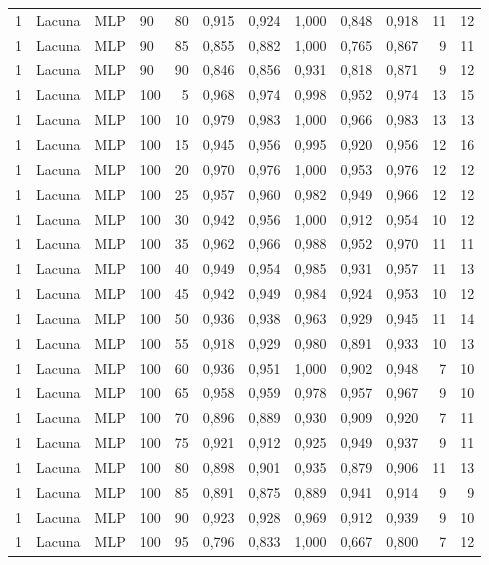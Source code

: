\begin{longtable}{ccclrrrrrrrr}
1 & Lacuna & MLP & 90 & 80 & 0,915 & 0,924 & 1,000 & 0,848 & 0,918 & 11 & 12 \\
1 & Lacuna & MLP & 90 & 85 & 0,855 & 0,882 & 1,000 & 0,765 & 0,867 & 9 & 11 \\
1 & Lacuna & MLP & 90 & 90 & 0,846 & 0,856 & 0,931 & 0,818 & 0,871 & 9 & 12 \\
1 & Lacuna & MLP & 100 & 5 & 0,968 & 0,974 & 0,998 & 0,952 & 0,974 & 13 & 15 \\
1 & Lacuna & MLP & 100 & 10 & 0,979 & 0,983 & 1,000 & 0,966 & 0,983 & 13 & 13 \\
1 & Lacuna & MLP & 100 & 15 & 0,945 & 0,956 & 0,995 & 0,920 & 0,956 & 12 & 16 \\
1 & Lacuna & MLP & 100 & 20 & 0,970 & 0,976 & 1,000 & 0,953 & 0,976 & 12 & 12 \\
1 & Lacuna & MLP & 100 & 25 & 0,957 & 0,960 & 0,982 & 0,949 & 0,966 & 12 & 12 \\
1 & Lacuna & MLP & 100 & 30 & 0,942 & 0,956 & 1,000 & 0,912 & 0,954 & 10 & 12 \\
1 & Lacuna & MLP & 100 & 35 & 0,962 & 0,966 & 0,988 & 0,952 & 0,970 & 11 & 11 \\
1 & Lacuna & MLP & 100 & 40 & 0,949 & 0,954 & 0,985 & 0,931 & 0,957 & 11 & 13 \\
1 & Lacuna & MLP & 100 & 45 & 0,942 & 0,949 & 0,984 & 0,924 & 0,953 & 10 & 12 \\
1 & Lacuna & MLP & 100 & 50 & 0,936 & 0,938 & 0,963 & 0,929 & 0,945 & 11 & 14 \\
1 & Lacuna & MLP & 100 & 55 & 0,918 & 0,929 & 0,980 & 0,891 & 0,933 & 10 & 13 \\
1 & Lacuna & MLP & 100 & 60 & 0,936 & 0,951 & 1,000 & 0,902 & 0,948 & 7 & 10 \\
1 & Lacuna & MLP & 100 & 65 & 0,958 & 0,959 & 0,978 & 0,957 & 0,967 & 9 & 10 \\
1 & Lacuna & MLP & 100 & 70 & 0,896 & 0,889 & 0,930 & 0,909 & 0,920 & 7 & 11 \\
1 & Lacuna & MLP & 100 & 75 & 0,921 & 0,912 & 0,925 & 0,949 & 0,937 & 9 & 11 \\
1 & Lacuna & MLP & 100 & 80 & 0,898 & 0,901 & 0,935 & 0,879 & 0,906 & 11 & 13 \\
1 & Lacuna & MLP & 100 & 85 & 0,891 & 0,875 & 0,889 & 0,941 & 0,914 & 9 & 9 \\
1 & Lacuna & MLP & 100 & 90 & 0,923 & 0,928 & 0,969 & 0,912 & 0,939 & 9 & 10 \\
1 & Lacuna & MLP & 100 & 95 & 0,796 & 0,833 & 1,000 & 0,667 & 0,800 & 7 & 12 \\

\end{longtable}
